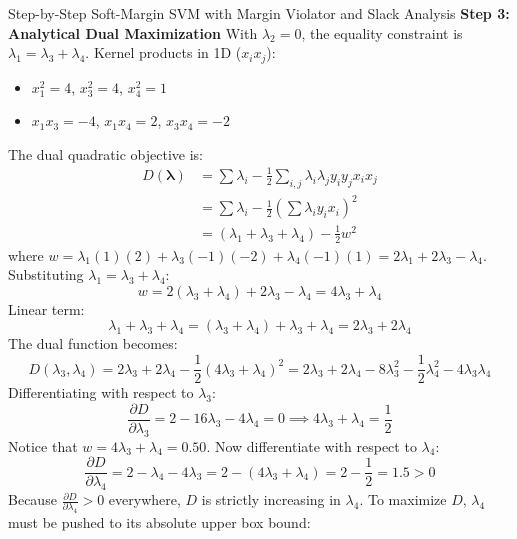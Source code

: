 \begin{examplebox}[breakable]{Step-by-Step Soft-Margin SVM with Margin Violator and Slack Analysis}
\textbf{Step 3: Analytical Dual Maximization}
With $\lambda_2 = 0$, the equality constraint is $\lambda_1 = \lambda_3 + \lambda_4$.
Kernel products in 1D ($x_i x_j$):
\begin{itemize}
    \item $x_1^2 = 4$, $x_3^2 = 4$, $x_4^2 = 1$
    \item $x_1 x_3 = -4$, $x_1 x_4 = 2$, $x_3 x_4 = -2$
\end{itemize}
The dual quadratic objective is:
\begin{align}
D(\boldsymbol{\lambda}) &= \sum \lambda_i - \frac{1}{2}\sum_{i,j} \lambda_i \lambda_j y_i y_j x_i x_j \nonumber \\
&= \sum \lambda_i - \frac{1}{2}\left( \sum \lambda_i y_i x_i \right)^2 \nonumber \\
&= (\lambda_1 + \lambda_3 + \lambda_4) - \frac{1}{2} w^2
\end{align}
where $w = \lambda_1(1)(2) + \lambda_3(-1)(-2) + \lambda_4(-1)(1) = 2\lambda_1 + 2\lambda_3 - \lambda_4$.
Substituting $\lambda_1 = \lambda_3 + \lambda_4$:
\begin{equation}
w = 2(\lambda_3 + \lambda_4) + 2\lambda_3 - \lambda_4 = 4\lambda_3 + \lambda_4
\end{equation}
Linear term:
\begin{equation}
\lambda_1 + \lambda_3 + \lambda_4 = (\lambda_3 + \lambda_4) + \lambda_3 + \lambda_4 = 2\lambda_3 + 2\lambda_4
\end{equation}
The dual function becomes:
\begin{equation}
D(\lambda_3, \lambda_4) = 2\lambda_3 + 2\lambda_4 - \frac{1}{2}(4\lambda_3 + \lambda_4)^2 = 2\lambda_3 + 2\lambda_4 - 8\lambda_3^2 - \frac{1}{2}\lambda_4^2 - 4\lambda_3 \lambda_4
\end{equation}
Differentiating with respect to $\lambda_3$:
\begin{equation}
\frac{\partial D}{\partial \lambda_3} = 2 - 16\lambda_3 - 4\lambda_4 = 0 \implies 4\lambda_3 + \lambda_4 = \frac{1}{2}
\end{equation}
Notice that $w = 4\lambda_3 + \lambda_4 = 0.50$.
Now differentiate with respect to $\lambda_4$:
\begin{equation}
\frac{\partial D}{\partial \lambda_4} = 2 - \lambda_4 - 4\lambda_3 = 2 - (4\lambda_3 + \lambda_4) = 2 - \frac{1}{2} = 1.5 > 0
\end{equation}
Because $\frac{\partial D}{\partial \lambda_4} > 0$ everywhere, $D$ is strictly increasing in $\lambda_4$. To maximize $D$, $\lambda_4$ must be pushed to its absolute upper box bound:

\end{examplebox}
